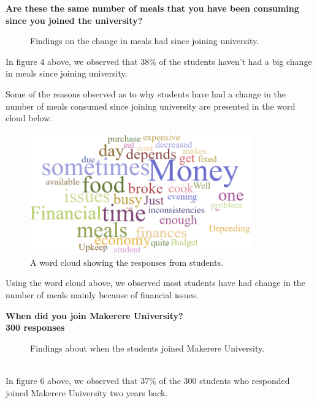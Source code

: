 \documentclass{article}
\begin{document}
\vspace{10pt}
\noindent
\textbf{Are these the same number of meals that you have been consuming since you joined the university?}
\begin{figure}[h]
    \centering
    \caption{Findings on the change in meals had since joining university.}
\end{figure}

\noindent In figure 4 above, we observed that 38\% of the students haven't had a big change in meals since joining university.

\vspace{30pt}

\noindent
Some of the reasons observed as to why students have had a change in the number of meals consumed since joining university are presented in the word cloud below.

\newpage
\begin{figure}[h]
    \centering
    \includegraphics[width=360px]{images/wordcloud1.PNG}
    \caption{A word cloud showing the responses from students.}
\end{figure}

\noindent Using the word cloud above, we observed most students have had change in the number of meals mainly because of financial issues.
\vspace{10pt}

\noindent
\textbf{When did you join Makerere University?\\300 responses}
\begin{figure}[h]
    \centering
    \caption{Findings about when the students joined Makerere University.}
\end{figure}
\\
\noindent In figure 6 above, we observed that 37\% of the 300 students who responded joined Makerere University two years back.
\end{document}
